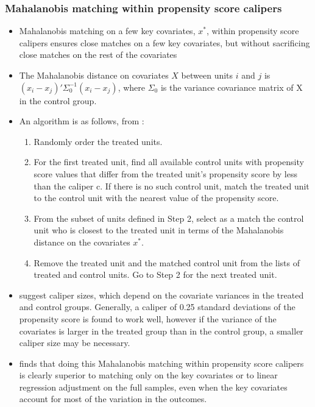 \documentclass[11pt,titlepage]{article}
\begin{document}
\subsubsection{Mahalanobis matching within propensity score calipers}
\begin{itemize} 
\item Mahalanobis matching on a few key covariates, $x^*$, within propensity score calipers ensures close matches on a few key covariates, but without sacrificing 
close matches on the rest of the covariates 
\item The Mahalanobis distance on covariates $X$ between units $i$ and $j$ is $(x_i-x_j)'\Sigma_{0}^{-1}(x_i-x_j)$, where $\Sigma_0$ is the variance covariance 
matrix of X in the control group.  
\item An algorithm is as follows, from \cite{RubTho00}:
\begin{enumerate}
\item Randomly order the treated units.
\item For the first treated unit, find all available control units with propensity score values that differ from the treated unit's propensity score by less than 
the caliper c.  If there is no such control unit, match the treated unit to the control unit with the nearest value of the propensity score.
\item From the subset of units defined in Step 2, select as a match the control unit who is closest to the treated unit in terms of the Mahalanobis distance
on the covariates $x^*$.  
\item Remove the treated unit and the matched control unit from the lists of treated and control units.  Go to Step 2 for the next treated unit.
\end{enumerate}
\item \cite{RosRub85a} suggest caliper sizes, which depend on the covariate variances in the treated and control groups.  Generally, a caliper of 0.25 standard deviations
of the propensity score is found to work well, however if the variance of the covariates is larger in the treated group than in the control group, a smaller caliper
size may be necessary.  
\item \cite{RubTho00} finds that doing this Mahalanobis matching within propensity score calipers is clearly superior to
matching only on the key covariates or to linear regression adjustment on the full samples, even when the key covariates account for most of the variation in the outcomes.
\end{itemize}
\end{document}
